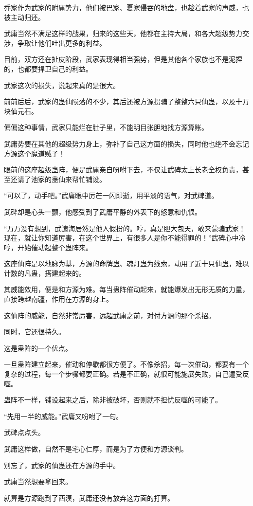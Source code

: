 \begin{this_body}
乔家作为武家的附庸势力，他们被巴家、夏家侵吞的地盘，也趁着武家的声威，也被主动归还。

武庸当然不满足这样的战果，归来的这些天，他都在主持大局，和各大超级势力交涉，争取让他们吐出更多的利益。

目前，双方还在扯皮阶段，武家表现得相当强势，但是其他各个家族也不是泥捏的，也都要捍卫自己的利益。

武家这次的损失，说起来真的是很大。

前前后后，武家的蛊仙陨落的不少，其后还被方源拐骗了整整六只仙蛊，以及十万块仙元石。

偏偏这种事情，武家只能烂在肚子里，不能明目张胆地找方源算账。

武庸势要在其他的超级势力身上，弥补了自己这方面的损失，同时他也绝不会忘记方源这个魔道贼子！

眼前的这座超级蛊阵，便是武庸亲自吩咐下去，不仅让武碑太上长老全权负责，甚至还请了池家的蛊仙来帮忙铺设。

“可以了，动手吧。”武庸眼中厉芒一闪即逝，用平淡的语气，对武碑道。

武碑却是心头一颤，他感受到了武庸平静的外表下的怒意和仇恨。

“万万没有想到，武遗海居然是他人假扮的。哼，真是胆大包天，敢来蒙骗武家！现在，就让你知道厉害，在这个世界上，有很多人是你不能得罪的！”武碑心中冷哼，开始催动起整个蛊阵来。

这座仙阵是以地脉为基，方源的命牌蛊、魂灯蛊为线索，动用了近十只仙蛊，难以计数的凡蛊，搭建起来的。

其威能效用，便是和方源为难。每当蛊阵催动起来，就能爆发出无形无质的力量，直接跨越南疆，作用在方源的身上。

这仙阵的威能，自然非常厉害，远超武庸之前，对付方源的那个杀招。

同时，它还很持久。

这是蛊阵的一个优点。

一旦蛊阵建立起来，催动和停歇都很方便了。不像杀招，每一次催动，都要有一个复杂的过程，每一个步骤都要正确。若是不正确，就很可能施展失败，自己遭受反噬。

蛊阵不一样，铺设起来之后，除非被破坏，否则就不担忧反噬的可能了。

“先用一半的威能。”武庸又吩咐了一句。

武碑点点头。

武庸这样做，自然不是宅心仁厚，而是为了方便和方源谈判。

别忘了，武家的仙蛊还在方源的手中。

武庸当然想要拿回来。

就算是方源跑到了西漠，武庸还没有放弃这方面的打算。


\end{this_body}
